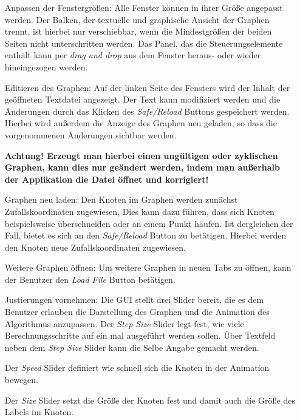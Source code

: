 \begin{enumerate}
    \item[Anpassen der Fenstergrößen:] Alle Fenster können in ihrer Größe angepasst werden. Der Balken, der textuelle und graphische Ansicht der Graphen trennt, ist hierbei nur verschiebbar, wenn die Mindestgrößen der beiden Seiten nicht unterschritten werden.
   Das Panel, das die Steuerungselemente enthält kann per \textit{drag and drop} aus dem Fenster heraus- oder wieder hineingezogen werden.
    
    \item[Editieren des Graphen:] Auf der linken Seite des Fensters wird der Inhalt der geöffneten Textdatei angezeigt. Der Text kann modifiziert werden und die Änderungen durch das Klicken des \textit{Safe/Reload} Buttons gespeichert werden. Hierbei wird außerdem die Anzeige des Graphen neu geladen, so dass die vorgenommenen Änderungen sichtbar werden. 
    
    \textbf{Achtung! Erzeugt man hierbei einen ungültigen oder zyklischen Graphen, kann dies nur geändert werden, indem man außerhalb der Applikation die Datei öffnet und korrigiert!}
    
    \item[Graphen neu laden:] Den Knoten im Graphen werden zunächst Zufallskoordinaten zugewiesen, Dies kann dazu führen, dass sich Knoten beispielsweise überschneiden oder an einem Punkt häufen. Ist dergleichen der Fall, bietet es sich an den \textit{Safe/Reload} Button zu betätigen. Hierbei werden den Knoten neue Zufallskoordinaten zugewiesen.
    
    \item[Weitere Graphen öffnen:] Um weitere Graphen in neuen Tabs zu öffnen, kann der Benutzer den \textit{Load File} Button betätigen.
    
    \item[Justierungen vornehmen:] Die GUI stellt drei Slider bereit, die es dem Benutzer erlauben die Darstellung des Graphen und die Animation des Algorithmus anzupassen. Der \textit{Step Size} Slider legt fest, wie viele Berechnungsschritte auf ein mal ausgeführt werden sollen. Über Textfeld neben dem \textit{Step Size} Slider kann die Selbe Angabe gemacht werden. 
    
    Der \textit{Speed} Slider definiert wie schnell sich die Knoten in der Animation bewegen.
    
    Der \textit{Size} Slider setzt die Größe der Knoten fest und damit auch die Größe des Labels im Knoten.
    

\end{enumerate}
